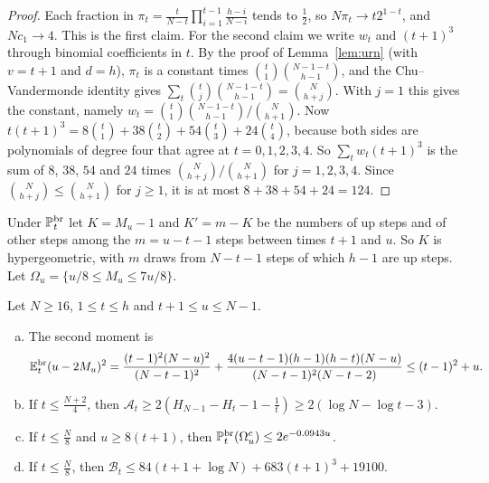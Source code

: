 \begin{proof}
Each fraction in $\pi_t=\frac t{N-t}\prod_{i=1}^{t-1}\frac{h-i}{N-i}$ tends
to $\frac12$, so $N\pi_t\to t2^{1-t}$, and $Nc_1\to4$. This is the first
claim. For the second claim we write $w_t$ and $(t+1)^3$ through binomial
coefficients in $t$. By the proof of Lemma~\ref{lem:urn} (with $v=t+1$ and
$d=h$), $\pi_t$ is a constant times $\binom t1\binom{N-1-t}{h-1}$, and the
Chu--Vandermonde identity gives
$\sum_t\binom tj\binom{N-1-t}{h-1}=\binom N{h+j}$. With $j=1$ this gives
the constant, namely $w_t=\binom t1\binom{N-1-t}{h-1}/\binom N{h+1}$. Now
$t(t+1)^3=8\binom t1+38\binom t2+54\binom t3+24\binom t4$, because both sides
are polynomials of degree four that agree at $t=0,1,2,3,4$. So
$\sum_tw_t(t+1)^3$ is the sum of $8$, $38$, $54$ and $24$ times
$\binom N{h+j}/\binom N{h+1}$ for $j=1,2,3,4$. Since
$\binom N{h+j}\le\binom N{h+1}$ for $j\ge1$, it is at most
$8+38+54+24=124$.
\end{proof}

Under $\mathbb{P}^{\mathrm{br}}_t$ let $K=M_u-1$ and $K'=m-K$ be the numbers of
up steps and of other steps among the $m=u-t-1$ steps between times $t+1$
and $u$. So $K$ is hypergeometric, with $m$ draws from $N-t-1$ steps of
which $h-1$ are up steps. Let $\Omega_u=\{u/8\le M_u\le7u/8\}$.

\begin{lemma}\label{lem:A-AB}
Let $N\ge16$, $1\le t\le h$ and $t+1\le u\le N-1$.
\begin{enumerate}[(a)]
\item The second moment is
\[
 \mathbb{E}^{\mathrm{br}}_t(u-2M_u)^2=\frac{(t-1)^2(N-u)^2}{(N-t-1)^2}
 +\frac{4(u-t-1)(h-1)(h-t)(N-u)}{(N-t-1)^2(N-t-2)}\le(t-1)^2+u .
\]
\item If $t\le\frac{N+2}4$, then
$\mathcal A_t\ge2(H_{N-1}-H_t-1-\frac1t)\ge2(\log N-\log t-3)$.
\item If $t\le\frac N8$ and $u\ge8(t+1)$, then
$\mathbb{P}^{\mathrm{br}}_t(\Omega_u^c)\le2e^{-0.0943u}$.
\item If $t\le\frac N8$, then $\mathcal B_t\le84(t+1+\log N)+683(t+1)^3+19100$.
\end{enumerate}
\end{lemma}

